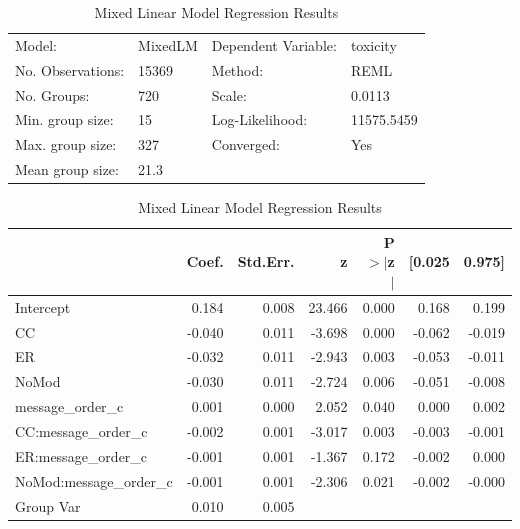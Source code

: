 \begin{table}
\caption{Mixed Linear Model Regression Results}
\label{}
\begin{center}
\begin{tabular}{llll}
\hline
Model:            & MixedLM & Dependent Variable: & toxicity    \\
No. Observations: & 15369   & Method:             & REML        \\
No. Groups:       & 720     & Scale:              & 0.0113      \\
Min. group size:  & 15      & Log-Likelihood:     & 11575.5459  \\
Max. group size:  & 327     & Converged:          & Yes         \\
Mean group size:  & 21.3    &                     &             \\
\hline
\end{tabular}
\end{center}

\begin{center}
\begin{tabular}{lrrrrrr}
\hline
                                                                                        &  Coef. & Std.Err. &      z & P$> |$z$|$ & [0.025 & 0.975]  \\
\hline
Intercept                                                                               &  0.184 &    0.008 & 23.466 &       0.000 &  0.168 &  0.199  \\
CC                     & -0.040 &    0.011 & -3.698 &       0.000 & -0.062 & -0.019  \\
ER                      & -0.032 &    0.011 & -2.943 &       0.003 & -0.053 & -0.011  \\
NoMod                   & -0.030 &    0.011 & -2.724 &       0.006 & -0.051 & -0.008  \\
message\_order\_c                                                                       &  0.001 &    0.000 &  2.052 &       0.040 &  0.000 &  0.002  \\
CC:message\_order\_c   & -0.002 &    0.001 & -3.017 &       0.003 & -0.003 & -0.001  \\
ER:message\_order\_c    & -0.001 &    0.001 & -1.367 &       0.172 & -0.002 &  0.000  \\
NoMod:message\_order\_c & -0.001 &    0.001 & -2.306 &       0.021 & -0.002 & -0.000  \\
Group Var                                                                               &  0.010 &    0.005 &        &             &        &         \\
\hline
\end{tabular}
\end{center}
\end{table}
\bigskip
